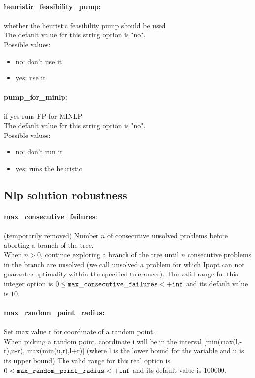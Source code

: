 \paragraph{heuristic\_feasibility\_pump:}\label{sec:heuristic_feasibility_pump} whether the heuristic feasibility pump should be used $\;$ \\

The default value for this string option is "no".
\\ 
Possible values:
\begin{itemize}
   \item no: don't use it
   \item yes: use it
\end{itemize}

\paragraph{pump\_for\_minlp:}\label{sec:pump_for_minlp} if yes runs FP for MINLP $\;$ \\

The default value for this string option is "no".
\\ 
Possible values:
\begin{itemize}
   \item no: don't run it
   \item yes: runs the heuristic
\end{itemize}

\subsection{Nlp solution robustness}
\label{sec:Nlp_solution_robustness}
\paragraph{max\_consecutive\_failures:}\label{sec:max_consecutive_failures} (temporarily removed) Number $n$ of consecutive unsolved problems before aborting a branch of the tree. $\;$ \\
 When $n > 0$, continue exploring a branch of the
tree until $n$ consecutive problems in the branch
are unsolved (we call unsolved a problem for
which Ipopt can not guarantee optimality within
the specified tolerances). The valid range for this integer option is
$0 \le {\tt max\_consecutive\_failures } <  {\tt +inf}$
and its default value is $10$.


\paragraph{max\_random\_point\_radius:}\label{sec:max_random_point_radius} Set max value r for coordinate of a random point. $\;$ \\
 When picking a random point, coordinate i will be
in the interval [min(max(l,-r),u-r),
max(min(u,r),l+r)] (where l is the lower bound
for the variable and u is its upper bound) The valid range for this real option is 
$0 <  {\tt max\_random\_point\_radius } <  {\tt +inf}$
and its default value is $100000$.


